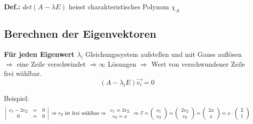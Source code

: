 		\textbf{Def.:} $det(A - \lambda E)$ heisst charakteristisches Polynom $\chi_A$\\

	\subsection{Berechnen der Eigenvektoren}
		\textbf{Für jeden Eigenwert $\lambda_i$}  Gleichungssystem aufstellen und mit Gauss auflösen $\Rightarrow$ eine Zeile
		verschwindet $\Rightarrow \infty$ Lösungen $\Rightarrow$ Wert von verschwundener Zeile frei wählbar.
		\begin{equation*}
			(A - \lambda_i E)\vec{v_i} = 0
		\end{equation*}

		Beispiel:
		\begin{equation*}
			\left|\begin{array}{ccc}
				v_1 - 2v_2 & = & 0\\
				0 & = & 0
			\end{array}\right| \\
			\Rightarrow \\
			v_2 \text{ ist frei wählbar} \\
			\Rightarrow \\
			\begin{array}{c}
				v_1 = 2v_2\\
				v_2 = x
			\end{array} \\
			\Rightarrow \\
			\vec{v} = \left(\begin{array}{c}
				v_1 \\
				v_2
			\end{array}\right) = \left(\begin{array}{c}
				2v_2\\
				v_2
			\end{array}\right) = \left(\begin{array}{c}
				2x \\
				x
			\end{array}\right) = x \cdot \left(\begin{array}{c}
				2 \\
				1
			\end{array}\right)
		\end{equation*}

